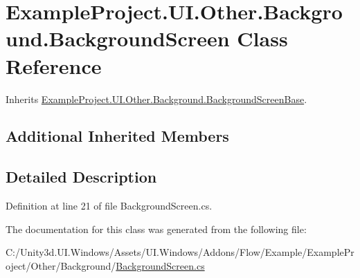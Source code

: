 \hypertarget{class_example_project_1_1_u_i_1_1_other_1_1_background_1_1_background_screen}{}\section{Example\+Project.\+U\+I.\+Other.\+Background.\+Background\+Screen Class Reference}
\label{class_example_project_1_1_u_i_1_1_other_1_1_background_1_1_background_screen}


Inherits \hyperlink{class_example_project_1_1_u_i_1_1_other_1_1_background_1_1_background_screen_base}{Example\+Project.\+U\+I.\+Other.\+Background.\+Background\+Screen\+Base}.

\subsection*{Additional Inherited Members}


\subsection{Detailed Description}


Definition at line 21 of file Background\+Screen.\+cs.



The documentation for this class was generated from the following file\+:\begin{DoxyCompactItemize}
\item 
C\+:/\+Unity3d.\+U\+I.\+Windows/\+Assets/\+U\+I.\+Windows/\+Addons/\+Flow/\+Example/\+Example\+Project/\+Other/\+Background/\hyperlink{_background_screen_8cs}{Background\+Screen.\+cs}\end{DoxyCompactItemize}
